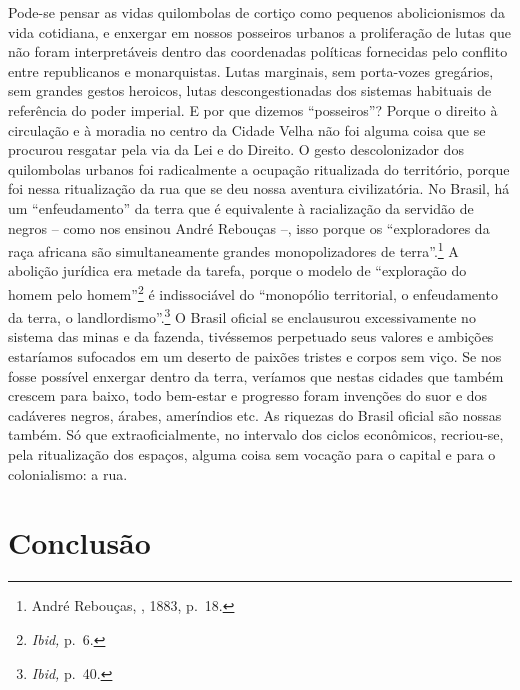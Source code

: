 Pode-se pensar as vidas quilombolas de cortiço como pequenos
abolicionismos da vida cotidiana, e enxergar em nossos posseiros urbanos
a proliferação de lutas que não foram interpretáveis dentro das
coordenadas políticas fornecidas pelo conflito entre republicanos e
monarquistas. Lutas marginais, sem porta-vozes gregários, sem grandes
gestos heroicos, lutas descongestionadas dos sistemas habituais de
referência do poder imperial. E por que dizemos ``posseiros''? Porque o
direito à circulação e à moradia no centro da Cidade Velha não foi
alguma coisa que se procurou resgatar pela via da Lei e do Direito. O
gesto descolonizador dos quilombolas urbanos foi radicalmente a ocupação
ritualizada do território, porque foi nessa ritualização da rua que se
deu nossa aventura civilizatória. No Brasil, há um ``enfeudamento'' da
terra que é equivalente à racialização da servidão de negros -- como nos
ensinou André Rebouças --, isso porque os ``exploradores da raça
africana são simultaneamente grandes monopolizadores de
terra''.\footnote{André Rebouças, , 1883, p.~18.} A abolição jurídica
era metade da tarefa, porque o modelo de ``exploração do homem pelo
homem''\footnote{\emph{Ibid,} p.~6.} é indissociável do ``monopólio
territorial, o enfeudamento da terra, o landlordismo''.\footnote{\emph{Ibid,}
  p.~40.} O Brasil oficial se enclausurou excessivamente no sistema das
minas e da fazenda, tivéssemos perpetuado seus valores e ambições
estaríamos sufocados em um deserto de paixões tristes e corpos sem viço.
Se nos fosse possível enxergar dentro da terra, veríamos que nestas
cidades que também crescem para baixo, todo bem-estar e progresso foram
invenções do suor e dos cadáveres negros, árabes, ameríndios etc. As
riquezas do Brasil oficial são nossas também. Só que extraoficialmente,
no intervalo dos ciclos econômicos, recriou-se, pela ritualização dos
espaços, alguma coisa sem vocação para o capital e para o colonialismo:
a rua.

\section*{Conclusão}\label{conclusuxe3o}

